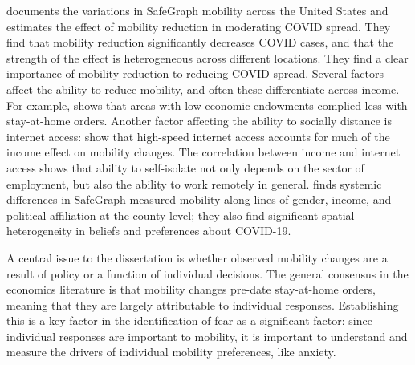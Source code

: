 \documentclass[12pt,a4]{article}
\begin{document}
\textcite{glaeserHowMuchDoes2020} documents the variations in SafeGraph mobility across the United States and estimates the effect of mobility reduction in moderating COVID spread. They find that mobility reduction significantly decreases COVID cases, and that the strength of the effect is heterogeneous across different locations. They find a clear importance of mobility reduction to reducing COVID spread. Several factors affect the ability to reduce mobility, and often these differentiate across income. For example, \textcite{wrightPovertyEconomicDislocation2020} shows that areas with low economic endowments complied less with stay-at-home orders. Another factor affecting the ability to socially distance is internet access: \textcite{chiouSocialDistancingInternet2020} show that high-speed internet access accounts for much of the income effect on mobility changes. The correlation between income and internet access shows that ability to self-isolate not only depends on the sector of employment, but also the ability to work remotely in general. \textcite{fanHeterogeneousActionsBeliefs2020} finds systemic differences in SafeGraph-measured mobility along lines of gender, income, and political affiliation at the county level; they also find significant spatial heterogeneity in beliefs and preferences about COVID-19.

A central issue to the dissertation is whether observed mobility changes are a result of policy or a function of individual decisions. The general consensus in the economics literature is that mobility changes pre-date stay-at-home orders, meaning that they are largely attributable to individual responses. Establishing this is a key factor in the identification of fear as a significant factor: since individual responses are important to mobility, it is important to understand and measure the drivers of individual mobility preferences, like anxiety.
\end{document}
